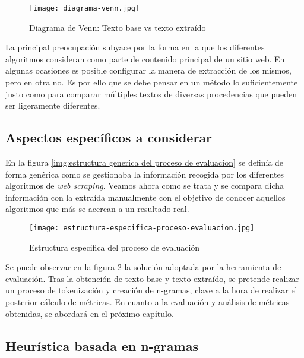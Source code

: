 \begin{figure}[tphb]
  \centering
  \texttt{[image: diagrama-venn.jpg]}
  \caption{Diagrama de Venn: Texto base vs texto extraído}
  \label{img:diagrama venn: texto base vs texto extraido}
\end{figure}

La principal preocupación subyace por la forma en la que los diferentes algoritmos consideran como parte
de contenido principal de un sitio web. En algunas ocasiones es posible configurar la manera de extracción
de los mismos, pero en otra no. Es por ello que se debe pensar en un método lo suficientemente justo como
para comparar múltiples textos de diversas procedencias que pueden ser ligeramente diferentes.

\subsection{Aspectos específicos a considerar}
\label{subsec:aspectos especificos a considerar}

En la figura \ref{img:estructura generica del proceso de evaluacion} se definía de forma genérica como se
gestionaba la información recogida por los diferentes algoritmos de \emph{web scraping}. Veamos ahora como
se trata y se compara dicha información con la extraída manualmente con el objetivo de conocer aquellos
algoritmos que más se acercan a un resultado real.

\begin{figure}[tphb]
  \centering
  \texttt{[image: estructura-especifica-proceso-evaluacion.jpg]}
  \caption{Estructura especifica del proceso de evaluación}
  \label{img:estructura específica del proceso de evaluacion}
\end{figure}

Se puede observar en la figura \ref{img:estructura específica del proceso de evaluacion} la solución
adoptada por la herramienta de evaluación. Tras la obtención de texto base y texto extraído, se pretende
realizar un proceso de tokenización y creación de n-gramas, clave a la hora de realizar el posterior cálculo
de métricas. En cuanto a la evaluación y análisis de métricas obtenidas, se abordará en el próximo capítulo.

\subsection{Heurística basada en n-gramas}
\label{subsec:heuristica basada en n-gramas}

